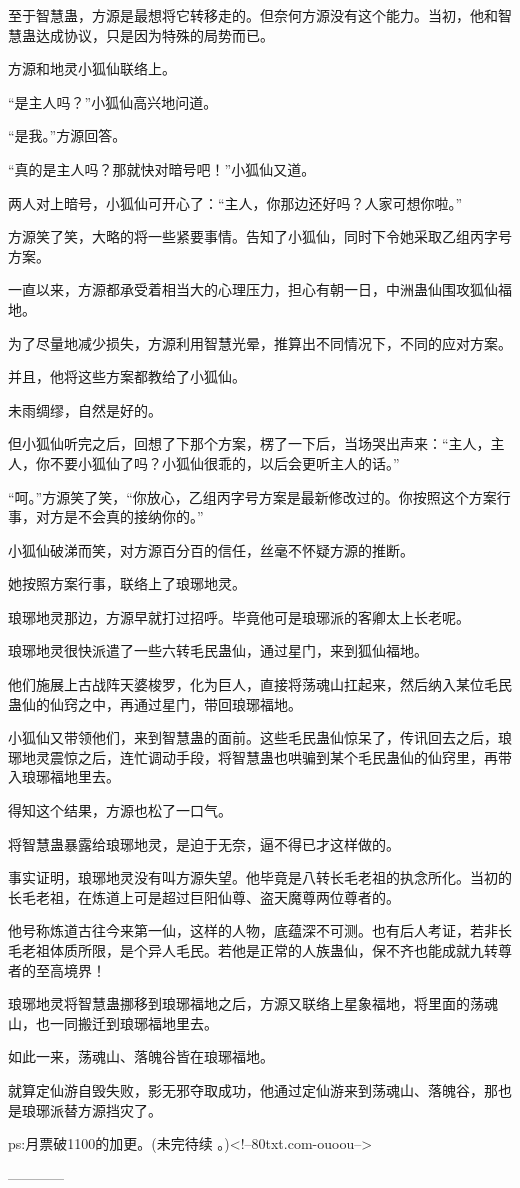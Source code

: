 \begin{this_body}
至于智慧蛊，方源是最想将它转移走的。但奈何方源没有这个能力。当初，他和智慧蛊达成协议，只是因为特殊的局势而已。

方源和地灵小狐仙联络上。

“是主人吗？”小狐仙高兴地问道。

“是我。”方源回答。

“真的是主人吗？那就快对暗号吧！”小狐仙又道。

两人对上暗号，小狐仙可开心了：“主人，你那边还好吗？人家可想你啦。”

方源笑了笑，大略的将一些紧要事情。告知了小狐仙，同时下令她采取乙组丙字号方案。

一直以来，方源都承受着相当大的心理压力，担心有朝一日，中洲蛊仙围攻狐仙福地。

为了尽量地减少损失，方源利用智慧光晕，推算出不同情况下，不同的应对方案。

并且，他将这些方案都教给了小狐仙。

未雨绸缪，自然是好的。

但小狐仙听完之后，回想了下那个方案，楞了一下后，当场哭出声来：“主人，主人，你不要小狐仙了吗？小狐仙很乖的，以后会更听主人的话。”

“呵。”方源笑了笑，“你放心，乙组丙字号方案是最新修改过的。你按照这个方案行事，对方是不会真的接纳你的。”

小狐仙破涕而笑，对方源百分百的信任，丝毫不怀疑方源的推断。

她按照方案行事，联络上了琅琊地灵。

琅琊地灵那边，方源早就打过招呼。毕竟他可是琅琊派的客卿太上长老呢。

琅琊地灵很快派遣了一些六转毛民蛊仙，通过星门，来到狐仙福地。

他们施展上古战阵天婆梭罗，化为巨人，直接将荡魂山扛起来，然后纳入某位毛民蛊仙的仙窍之中，再通过星门，带回琅琊福地。

小狐仙又带领他们，来到智慧蛊的面前。这些毛民蛊仙惊呆了，传讯回去之后，琅琊地灵震惊之后，连忙调动手段，将智慧蛊也哄骗到某个毛民蛊仙的仙窍里，再带入琅琊福地里去。

得知这个结果，方源也松了一口气。

将智慧蛊暴露给琅琊地灵，是迫于无奈，逼不得已才这样做的。

事实证明，琅琊地灵没有叫方源失望。他毕竟是八转长毛老祖的执念所化。当初的长毛老祖，在炼道上可是超过巨阳仙尊、盗天魔尊两位尊者的。

他号称炼道古往今来第一仙，这样的人物，底蕴深不可测。也有后人考证，若非长毛老祖体质所限，是个异人毛民。若他是正常的人族蛊仙，保不齐也能成就九转尊者的至高境界！

琅琊地灵将智慧蛊挪移到琅琊福地之后，方源又联络上星象福地，将里面的荡魂山，也一同搬迁到琅琊福地里去。

如此一来，荡魂山、落魄谷皆在琅琊福地。

就算定仙游自毁失败，影无邪夺取成功，他通过定仙游来到荡魂山、落魄谷，那也是琅琊派替方源挡灾了。

ps:月票破1100的加更。(未完待续 。)<!--80txt.com-ouoou-->

------------

\end{this_body}

